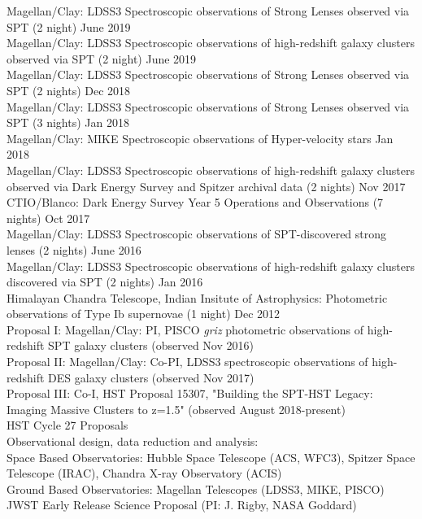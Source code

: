 \documentclass[margin]{res}
\begin{document}
\begin{resume}
Magellan/Clay: LDSS3 Spectroscopic observations of Strong Lenses observed via SPT (2 night) \hfill June 2019\\
Magellan/Clay: LDSS3 Spectroscopic observations of high-redshift galaxy clusters observed via SPT (2 night) \hfill June 2019\\
Magellan/Clay: LDSS3 Spectroscopic observations of Strong Lenses observed via SPT (2 nights) \hfill Dec 2018\\
Magellan/Clay: LDSS3 Spectroscopic observations of Strong Lenses observed via SPT (3 nights) \hfill Jan 2018\\
Magellan/Clay: MIKE Spectroscopic observations of Hyper-velocity stars \hfill Jan 2018\\
Magellan/Clay: LDSS3 Spectroscopic observations of high-redshift galaxy clusters observed via Dark Energy Survey and Spitzer archival data (2 nights) \hfill Nov 2017\\
CTIO/Blanco: Dark Energy Survey Year 5 Operations and Observations (7 nights) \hfill Oct 2017\\
Magellan/Clay: LDSS3 Spectroscopic observations of SPT-discovered strong lenses (2 nights) \hfill June 2016\\
Magellan/Clay: LDSS3 Spectroscopic observations of high-redshift galaxy clusters discovered via SPT (2 nights) \hfill Jan 2016\\
Himalayan Chandra Telescope, Indian Insitute of Astrophysics: Photometric observations of Type Ib supernovae (1 night) \hfill Dec 2012\\

Proposal I: Magellan/Clay: PI, PISCO \textit{griz} photometric observations of high-redshift SPT galaxy clusters (observed Nov 2016)\\
Proposal II: Magellan/Clay: Co-PI, LDSS3 spectroscopic observations of high-redshift DES galaxy clusters (observed Nov 2017)\\
Proposal III: Co-I, HST Proposal 15307, "Building the SPT-HST Legacy: Imaging Massive Clusters to z=1.5" (observed August 2018-present)\\
HST Cycle 27 Proposals\\

Observational design, data reduction and analysis:\\
Space Based Observatories: Hubble Space Telescope (ACS, WFC3), Spitzer Space Telescope (IRAC), Chandra X-ray Observatory (ACIS)\\
Ground Based Observatories: Magellan Telescopes (LDSS3, MIKE, PISCO)\\
JWST Early Release Science Proposal (PI: J. Rigby, NASA Goddard)


\end{resume}
\end{document}
